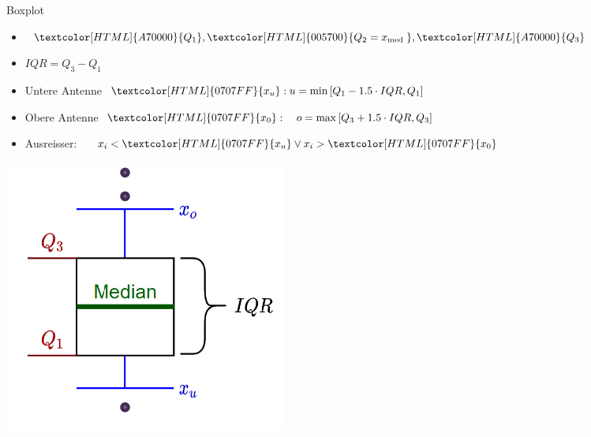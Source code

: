 \begin{definition}{Boxplot}\\
\begin{minipage}{0.6\columnwidth}
\begin{itemize}
  \setlength{\itemsep}{5pt}
  \item $\textcolor[HTML]{A70000}{Q_{1}},\textcolor[HTML]{005700}{ Q_{2}=x_{\text {med }}},\textcolor[HTML]{A70000}{ Q_{3}}$
  \item $I Q R=Q_{3}-Q_{1}$
  \item Untere Antenne $\textcolor[HTML]{0707FF}{x_{u}}:\\ u=\min \left[Q_{1}-1.5 \cdot I Q R, Q_{1}\right]$
  \item Obere Antenne $\textcolor[HTML]{0707FF}{x_{0}}:\\ \quad o=\max \left[Q_{3}+1.5 \cdot I Q R, Q_{3}\right]$
  \item Ausreisser: $\quad x_{i}<\textcolor[HTML]{0707FF}{x_{u}} \vee x_{i}>\textcolor[HTML]{0707FF}{x_{0}}$
\end{itemize}
\end{minipage}%
\begin{minipage}{0.4\columnwidth}
  \includegraphics[width=\textwidth]{images/boxplot.png}
\end{minipage}
\end{definition}

